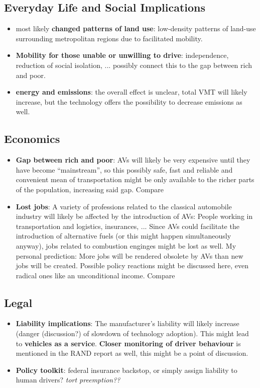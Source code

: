\documentclass[11pt]{article}
\begin{document}
\subsection{Everyday Life and Social Implications}
\cite{Rand:16}
\begin{itemize}
\item most likely \textbf{changed patterns of land use}: low-density patterns of land-use surrounding metropolitan regions due to facilitated mobility.  
\item \textbf{Mobility for those unable or unwilling to drive}: independence, reduction of social isolation, ... possibly connect this to the gap between rich and poor.
\item \textbf{energy and emissions}: the overall effect is unclear, total VMT will likely increase, but the technology offers the possibility to decrease emissions as well. 
\end{itemize}

\subsection{Economics}
\begin{itemize}
\item \textbf{Gap between rich and poor}: AVs will likely be very expensive until they have become ``mainstream'', so this possibly safe, fast and reliable and convenient mean of transportation might be only available to the richer parts of the population, increasing said gap. Compare \cite[p. 39]{Rand:16}
\item \textbf{Lost jobs}: A variety of professions related to the classical automobile industry will likely be affected by the introduction of AVs: People working in transportation and logistics, insurances, ... Since AVs could facilitate the introduction of alternative fuels (or this might happen simultaneously anyway), jobs related to combustion enginges might be lost as well. My personal prediction: More jobs will be rendered obsolete by AVs than new jobs will be created. Possible policy reactions might be discussed here, even radical ones like an unconditional income. Compare \cite[p. 40ff]{Rand:16}
\end{itemize}
\subsection{Legal}
\begin{itemize}
\item \textbf{Liability implications}: The manufacturer's liability will likely increase (danger (discussion?) of slowdown of technology adoption). This might lead to \textbf{vehicles as a service}. \textbf{Closer monitoring of driver behaviour} is mentioned in the RAND report as well, this might be a point of discussion.
\item \textbf{Policy toolkit}: federal insurance backstop, or simply assign liability to human drivers? \textit{tort preemption??}
\end{itemize}
\end{document}
